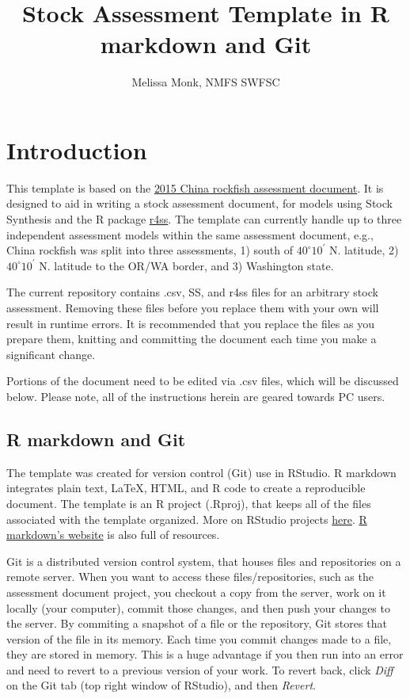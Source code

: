\documentclass[12pt,]{article}
\title{Stock Assessment Template in R markdown and Git}
\author{Melissa Monk, NMFS SWFSC}
\date{}
\begin{document}
\maketitle

{
\setcounter{tocdepth}{3}
\tableofcontents
}
\newpage

\section{Introduction}\label{introduction}

This template is based on the
\href{http://www.pcouncil.org/wp-content/uploads/2015/08/H3_Att3_China_FULLAssmt_E-Only_SEPT2015BB.pdf}{2015
China rockfish assessment document}. It is designed to aid in writing a
stock assessment document, for models using Stock Synthesis and the R
package \href{https://github.com/r4ss/r4ss}{r4ss}. The template can
currently handle up to three independent assessment models within the
same assessment document, e.g., China rockfish was split into three
assessments, 1) south of \(40^\circ 10^\prime\) N. latitude, 2)
\(40^\circ 10^\prime\) N. latitude to the OR/WA border, and 3)
Washington state.

The current repository contains .csv, SS, and r4ss files for an
arbitrary stock assessment. Removing these files before you replace them
with your own will result in runtime errors. It is recommended that you
replace the files as you prepare them, knitting and committing the
document each time you make a significant change.

Portions of the document need to be edited via .csv files, which will be
discussed below. Please note, all of the instructions herein are geared
towards PC users.

\subsection{R markdown and Git}\label{r-markdown-and-git}

The template was created for version control (Git) use in RStudio. R
markdown integrates plain text, \LaTeX, HTML, and R code to create a
reproducible document. The template is an R project (.Rproj), that keeps
all of the files associated with the template organized. More on RStudio
projects
\href{https://support.rstudio.com/hc/en-us/articles/200526207-Using-Projects}{here}.
\href{http://rmarkdown.rstudio.com/}{R markdown's website} is also full
of resources.

Git is a distributed version control system, that houses files and
repositories on a remote server. When you want to access these
files/repositories, such as the assessment document project, you
checkout a copy from the server, work on it locally (your computer),
commit those changes, and then push your changes to the server. By
commiting a snapshot of a file or the repository, Git stores that
version of the file in its memory. Each time you commit changes made to
a file, they are stored in memory. This is a huge advantage if you then
run into an error and need to revert to a previous version of your work.
To revert back, click \emph{Diff} on the Git tab (top right window of
RStudio), and then \emph{Revert}.
\end{document}
